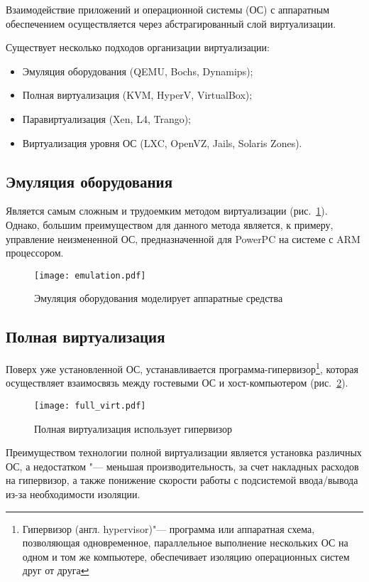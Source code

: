 Взаимодействие приложений и операционной системы (ОС) с аппаратным обеспечением осуществляется через абстрагированный слой виртуализации. 

Существует несколько подходов организации виртуализации:
\begin{itemize}
    \item Эмуляция оборудования (QEMU, Bochs, Dynamips);
    \item Полная виртуализация (KVM, HyperV, VirtualBox);
    \item Паравиртуализация (Xen, L4, Trango);
    \item Виртуализация уровня ОС (LXC, OpenVZ, Jails, Solaris Zones).
\end{itemize}

\subsection{Эмуляция оборудования}
Является самым сложным и трудоемким методом виртуализации (рис.~\ref{pic:emulation}).
Однако, большим преимуществом для данного метода является, к примеру, управление неизмененной ОС, предназначенной для PowerPC на системе с ARM процессором.
\begin{figure}[ht]
    \centering
	\texttt{[image: emulation.pdf]}
	\caption{Эмуляция оборудования моделирует аппаратные средства}\label{pic:emulation}
\end{figure}

\subsection{Полная виртуализация}
Поверх уже установленной ОС, устанавливается программа-гипервизор\footnote{Гипервизор (англ. hypervisor)"--- программа или аппаратная схема, позволяющая одновременное, параллельное выполнение нескольких ОС на одном и том же компьютере, обеспечивает изоляцию операционных систем друг от друга}, которая осуществляет взаимосвязь между гостевыми ОС и хост-компьютером (рис.~\ref{pic:full_virt}).
\begin{figure}[ht]
    \centering
	\texttt{[image: full\_virt.pdf]}
	\caption{Полная виртуализация использует гипервизор}\label{pic:full_virt}
\end{figure}

Преимуществом технологии полной виртуализации является установка различных ОС, а недостатком "--- меньшая производительность, за счет накладных расходов на гипервизор, а также понижение скорости работы с подсистемой ввода/вывода из-за необходимости изоляции.

